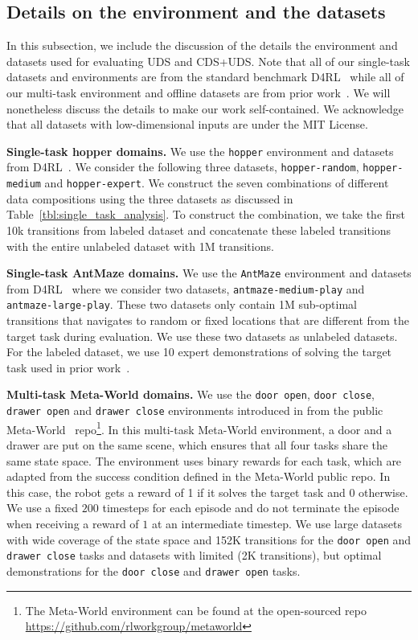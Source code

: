 \subsection{Details on the environment and the datasets}
\label{app:env_data_details}

In this subsection, we include the discussion of the details the environment and datasets used for evaluating UDS and CDS+UDS. Note that all of our single-task datasets and environments are from the standard benchmark D4RL~\citep{fu2020d4rl} while all of our multi-task environment and offline datasets are from prior work~\citep{yu2021conservative}. We will nonetheless discuss the details to make our work self-contained.  We acknowledge that all datasets with low-dimensional inputs are under the MIT License.

\textbf{Single-task hopper domains.} We use the \texttt{hopper} environment and datasets from D4RL~\citep{fu2020d4rl}. We consider the following three datasets, \texttt{hopper-random}, \texttt{hopper-medium} and \texttt{hopper-expert}. We construct the seven combinations of different data compositions using the three datasets as discussed in Table~\ref{tbl:single_task_analysis}. To construct the combination, we take the first 10k transitions from labeled dataset and concatenate these labeled transitions with the entire unlabeled dataset with 1M transitions.

\textbf{Single-task AntMaze domains.} We use the \texttt{AntMaze} environment and datasets from D4RL~\citep{fu2020d4rl} where we consider two datasets, \texttt{antmaze-medium-play} and \texttt{antmaze-large-play}. These two datasets only contain 1M sub-optimal transitions that navigates to random or fixed locations that are different from the target task during evaluation. We use these two datasets as unlabeled datasets. For the labeled dataset, we use 10 expert demonstrations of solving the target task used in prior work~\citep{yang2021trail}.

\textbf{Multi-task Meta-World domains.} We use the \texttt{door open}, \texttt{door close}, \texttt{drawer open} and \texttt{drawer close} environments introduced in \cite{yu2021conservative} from the public Meta-World~\citep{yu2020metaworld} repo\footnote{The Meta-World environment can be found at the open-sourced repo \url{https://github.com/rlworkgroup/metaworld}}. In this multi-task Meta-World environment, a door and a drawer are put on the same scene, which ensures that all four tasks share the same state space. The environment uses binary rewards for each task, which are adapted from the success condition defined in the Meta-World public repo. In this case, the robot gets a reward of 1 if it solves the target task and 0 otherwise. We use a fixed $200$ timesteps for each episode and do not terminate the episode when receiving a reward of $1$ at an intermediate timestep. We use large datasets with wide coverage of the state space and 152K transitions for the \texttt{door open} and \texttt{drawer close} tasks and datasets with limited (2K transitions), but optimal demonstrations for the \texttt{door close} and \texttt{drawer open} tasks.

